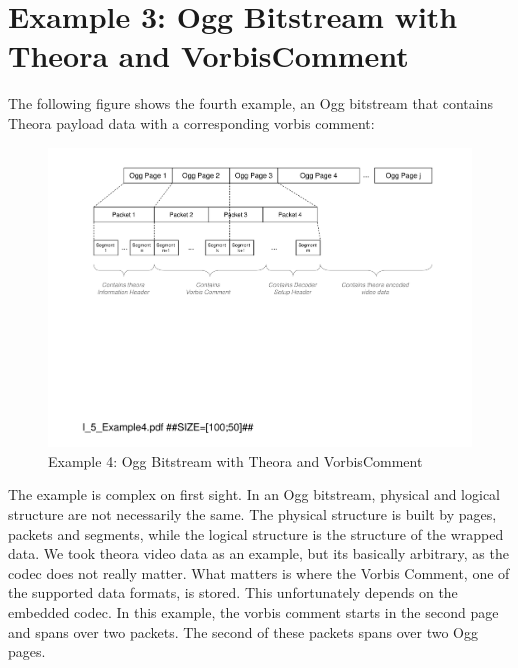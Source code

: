 \section{Example 3: Ogg Bitstream with Theora and VorbisComment}
\label{sec:Example4MP3FileWithID3v23AndID3v11}

The following figure shows the fourth example, an Ogg bitstream that contains Theora payload data with a corresponding vorbis comment:

\begin{figure}[H]
\centering
\includegraphics[width=1.00\textwidth]{figures/I_Example4.pdf}
\caption{Example 4: Ogg Bitstream with Theora and VorbisComment}
\label{fig:Example4MP3filewithtwoID3tags}
\end{figure}

The example is complex on first sight. In an Ogg bitstream, physical and logical structure are not necessarily the same. The physical structure is built by pages, packets and segments, while the logical structure is the structure of the wrapped data. We took theora video data as an example, but its basically arbitrary, as the codec does not really matter. What matters is where the Vorbis Comment, one of the supported data formats, is stored. This unfortunately depends on the embedded codec. In this example, the vorbis comment starts in the second page and spans over two packets. The second of these packets spans over two Ogg pages.


